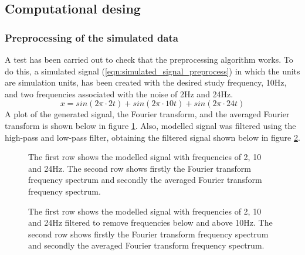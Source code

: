 \documentclass[12pt, a4paper]{article} %
\begin{document}
\setlength{\parskip}{0mm}

\subsection{Computational desing}

\subsubsection{Preprocessing of the simulated data}

A test has been carried out to check that the preprocessing algorithm works. To do this, a simulated signal (\ref{eqn:simulated_signal_preprocess}) in which the units are simulation units, has been created with the desired study frequency, 10Hz, and two frequencies associated with the noise of 2Hz and 24Hz. 
\setlength{\parskip}{4mm}
\begin{equation} \label{eqn:simulated_signal_preprocess}
	x = sin(2\pi\cdot 2t) + sin(2\pi\cdot 10t) + sin(2\pi\cdot 24t)
\end{equation}
A plot of the generated signal, the Fourier transform, and the averaged Fourier transform is shown below in figure \ref{fig:noisy_data_simulated}. Also, modelled signal was filtered using the high-pass and low-pass filter, obtaining the filtered signal shown below in figure \ref{fig:noisy_filtered_data_simulated}.

\begin{figure}[htbp]
	\centering
	
	\caption{The first row shows the modelled signal with frequencies of 2, 10 and 24Hz. The second row shows firstly the Fourier transform frequency spectrum and secondly the averaged Fourier transform frequency spectrum.}
	\label{fig:noisy_data_simulated}
\end{figure}


\begin{figure}[htbp]
	\centering
	
	\caption{The first row shows the modelled signal with frequencies of 2, 10 and 24Hz filtered to remove frequencies below and above 10Hz. The second row shows firstly the Fourier transform frequency spectrum and secondly the averaged Fourier transform frequency spectrum.}
	\label{fig:noisy_filtered_data_simulated}
\end{figure}
\end{document}
